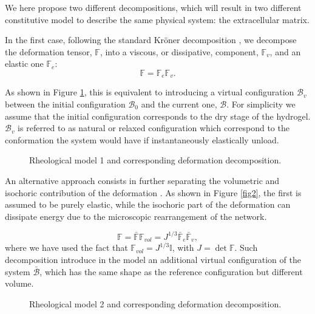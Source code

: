 \documentclass[12pt]{extarticle}
\newcommand{\F}{\ensuremath{\mathbb{F}}}
\begin{document}
We here propose two different decompositions, which will result in two different constitutive model to describe the same physical system: the extracellular matrix.

In the first case, following the standard Kr\"{o}ner decomposition \cite{kro}, we decompose the deformation tensor, $\F$, into a viscous, or dissipative, component, $\F_v$, and an elastic one $\F_e$:
\begin{equation}
\F=\F_e\F_v.
\end{equation}

As shown in Figure \ref{fig1}, this is equivalent to introducing a virtual configuration $\mathcal{B}_v$ between the initial configuration $\mathcal{B}_0$ and the current one, $\mathcal{B}$. For simplicity we assume that the initial configuration corresponds to the dry stage of the hydrogel. $\mathcal{B}_v$ is referred to as natural or relaxed configuration which correspond to the conformation the system would have if instantaneously elastically unload.

\begin{figure}[h!]
	\hspace{10mm}
\def\svgwidth{0.85\linewidth}

\caption{Rheological model 1 and corresponding deformation decomposition.}
\label{fig1}
\end{figure}

An alternative approach consists in further separating the volumetric and isochoric contribution of the deformation \cite{magneto,NGUYEN,Jeru}. As shown in Figure \ref{fig2}, the first is assumed to be purely elastic, while the isochoric part of the deformation can dissipate energy due to the microscopic rearrangement of the network. 

\begin{equation}
\F= \bar{\F} \F_{vol}= J^{1/3} \bar{\F}_e \bar{\F}_v,
\end{equation}
where we have used the fact that $\F_{vol}=J^{1/3}\mathbb{I}$, with $J=\det \F$. Such decomposition introduce in the model an additional virtual configuration of the system $\bar{\mathcal{B}}$, which has the same shape as the reference configuration but different volume. 

\begin{figure}[h!]
	\hspace{5mm}
	\def\svgwidth{1\linewidth}
	
	\caption{Rheological model 2 and corresponding deformation decomposition.}
	\label{Model2}
\end{figure}
\end{document}
